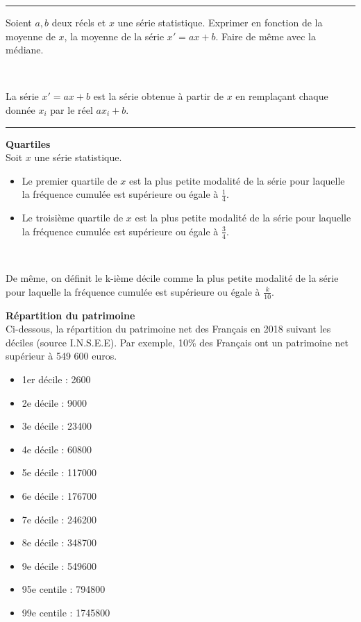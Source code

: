\documentclass[../PolyS4.tex]{subfiles}
\begin{document}
\vspace{1em}
\hrule
\vspace{1em}


Soient $a, b$ deux réels et $x$ une série statistique. Exprimer en fonction de la moyenne de $x$, la moyenne de la série $x' = ax + b$. Faire de même avec la médiane.

\begin{Rmq}$\,$

La série $x' = ax + b$ est la série obtenue à partir de $x$ en remplaçant chaque donnée $x_i$ par le réel $ax_i + b$.
\end{Rmq}

\vspace{1em}
\hrule
\vspace{1em}

\begin{Def}\textbf{Quartiles}\\

Soit $x$ une série statistique.
\begin{itemize}
    \item Le premier quartile de $x$ est la plus petite modalité de la série pour laquelle la fréquence cumulée est supérieure ou égale à $\frac{1}{4}$.
    \item Le troisième quartile de $x$ est la plus petite modalité de la série pour laquelle la fréquence cumulée est supérieure ou égale à $\frac{3}{4}$.
\end{itemize}
\end{Def}

\begin{Rmq}$\,$

De même, on définit le k-ième décile comme la plus petite modalité de la série pour laquelle la fréquence cumulée est supérieure ou égale à $\frac{k}{10}$.
\end{Rmq}

\begin{Ex}\textbf{Répartition du patrimoine}\\

Ci-dessous, la répartition du patrimoine net des Français en 2018 suivant les déciles (source I.N.S.E.E). Par exemple, 10\% des Français ont un patrimoine net supérieur à 549 600 euros.

\begin{itemize}
    \item 1er décile : 2600
    \item 2e décile : 9000
    \item 3e décile : 23400
    \item 4e décile : 60800
    \item 5e décile : 117000
    \item 6e décile : 176700
    \item 7e décile : 246200
    \item 8e décile : 348700
    \item 9e décile : 549600
    \item 95e centile : 794800
    \item 99e centile : 1745800
\end{itemize}
\end{Ex}
\end{document}
